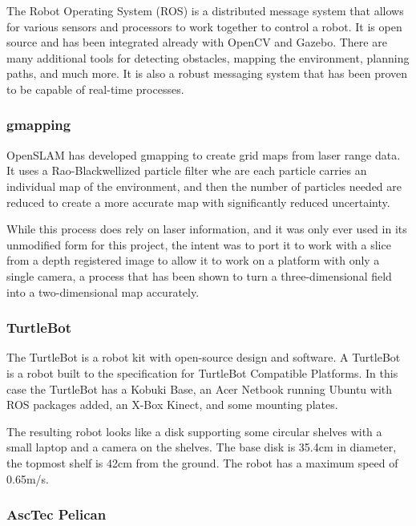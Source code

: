 \documentclass{article}[12]
\begin{document}
		The Robot Operating System (ROS) is a distributed message system that allows for various sensors and processors to work together to control a robot. It is open source and has been integrated already with OpenCV and Gazebo. There are many additional tools for detecting obstacles, mapping the environment, planning paths, and much more. It is also a robust messaging system that has been proven to be capable of real-time processes.
		
		\subsubsection{gmapping}
		
		OpenSLAM has developed gmapping to create grid maps from laser range data. It uses a Rao-Blackwellized particle filter whe are each particle carries an individual map of the environment, and then the number of particles needed are reduced to create a more accurate map with significantly reduced uncertainty.\cite{grisetti_stachniss_burgard}
		
		While this process does rely on laser information, and it was only ever used in its unmodified form for this project, the intent was to port it to work with a slice from a depth registered image to allow it to work on a platform with only a single camera, a process that has been shown to turn a three-dimensional field into a two-dimensional map accurately.\cite{2018nanomap}
		
		
		\subsubsection{TurtleBot}
		
		The TurtleBot is a robot kit with open-source design and software. A TurtleBot is a robot built to the specification for TurtleBot Compatible Platforms\cite{wise_foote_2011}. In this case the TurtleBot has a Kobuki Base, an Acer Netbook running Ubuntu with ROS packages added, an X-Box Kinect, and some mounting plates. 
		
		The resulting robot looks like a disk supporting some circular shelves with a small laptop and a camera on the shelves. The base disk is 35.4cm in diameter, the topmost shelf is 42cm from the ground. The robot has a maximum speed of 0.65m/s. 
		
		\subsubsection{AscTec Pelican}
		
\end{document}
